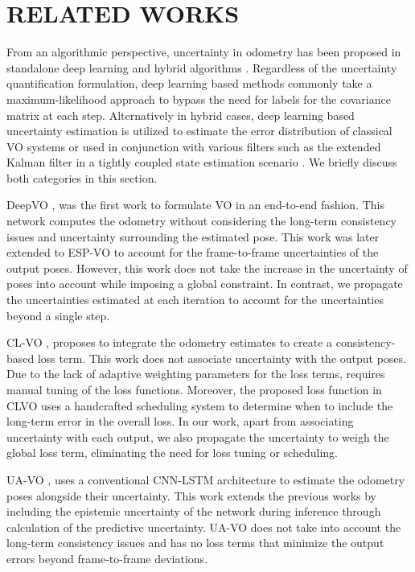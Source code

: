 \documentclass[letterpaper, 10 pt]{ieeeconf}  %
\begin{document}
\section{RELATED WORKS}
\label{sec:related}
From an algorithmic perspective, uncertainty in odometry has been proposed in standalone deep learning \cite{wang2018end} and hybrid algorithms \cite{liu2018deep}. Regardless of the uncertainty quantification formulation, deep learning based methods commonly take a maximum-likelihood approach to bypass the need for labels for the covariance matrix at each step. Alternatively in hybrid cases, deep learning based uncertainty estimation is utilized to estimate the error distribution of classical VO systems or used in conjunction with various filters such as the extended Kalman filter in a tightly coupled state estimation scenario \cite{li2020towards}. We briefly discuss both categories in this section.

DeepVO \cite{wang2017deepvo}, was the first work to formulate VO in an end-to-end fashion. This network computes the odometry without considering the long-term consistency issues and uncertainty surrounding the estimated pose. This work was later extended to ESP-VO \cite{wang2018end} to account for the frame-to-frame uncertainties of the output poses. However, this work does not take the increase in the uncertainty of poses into account while imposing a global constraint. In contrast, we propagate the uncertainties estimated at each iteration to account for the uncertainties beyond a single step.

CL-VO \cite{saputra2019learning}, proposes to integrate the odometry estimates to create a consistency-based loss term. This work does not associate uncertainty with the output poses. Due to the lack of adaptive weighting parameters for the loss terms, \cite{saputra2019learning} requires manual tuning of the loss functions. Moreover, the proposed loss function in CLVO uses a handcrafted scheduling system to determine when to include the long-term error in the overall loss. In our work, apart from associating uncertainty with each output, we also propagate the uncertainty to weigh the global loss term, eliminating the need for loss tuning or scheduling.

UA-VO \cite{costante2020uncertainty}, uses a conventional CNN-LSTM architecture to estimate the odometry poses alongside their uncertainty. This work extends the previous works by including the epistemic uncertainty of the network during inference through calculation of the predictive uncertainty. UA-VO does not take into account the long-term consistency issues and has no loss terms that minimize the output errors beyond frame-to-frame deviations.
\end{document}

